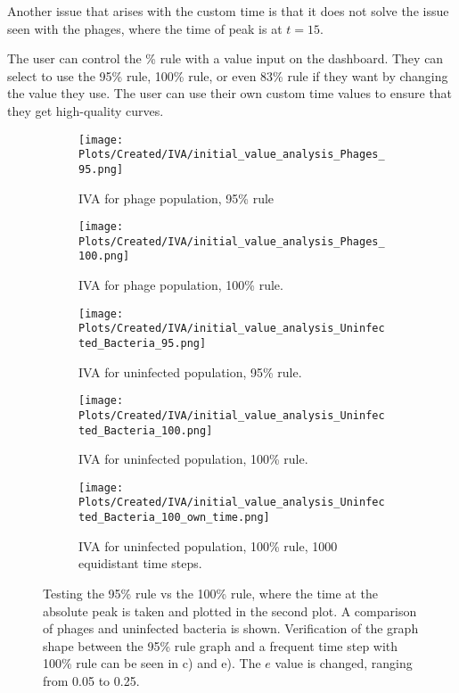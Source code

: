 Another issue that arises with the custom time is that it does not solve the issue seen with the phages, where the time of peak is at $t=15$. 

The user can control the \% rule with a value input on the dashboard. 
They can select to use the 95\% rule, 100\% rule, or even 83\% rule if they want by changing the value they use. 
The user can use their own custom time values to ensure that they get high-quality curves. 

\begin{figure}
    \centering
    \begin{subfigure}{1\linewidth}
        \centering
        \texttt{[image: Plots/Created/IVA/initial\_value\_analysis\_Phages\_95.png]}
        \caption{
            IVA for phage population, 95\% rule
        }
        \label{fig:appendixF:IVA_phage_95}
    \end{subfigure}
    \hfill
    \begin{subfigure}{1\linewidth}
        \centering
        \texttt{[image: Plots/Created/IVA/initial\_value\_analysis\_Phages\_100.png]}
        \caption{
            IVA for phage population, 100\% rule.  
        }
        \label{fig:appendixF:IVA_phages_100}
    \end{subfigure}
    \hfill
    \begin{subfigure}{1\linewidth}
        \centering
        \texttt{[image: Plots/Created/IVA/initial\_value\_analysis\_Uninfected\_Bacteria\_95.png]}
        \caption{
            IVA for uninfected population, 95\% rule. 
        }
        \label{fig:appendixF:IVA_uninfected_bacteria_95}
    \end{subfigure}
    \hfill 
    \begin{subfigure}{1\linewidth}
        \centering
        \texttt{[image: Plots/Created/IVA/initial\_value\_analysis\_Uninfected\_Bacteria\_100.png]}
        \caption{
            IVA for uninfected population, 100\% rule. 
        }
        \label{fig:appendixF:IVA_uninfected_bacteria_100}
    \end{subfigure}
    \begin{subfigure}{1\linewidth}
        \centering
        \texttt{[image: Plots/Created/IVA/initial\_value\_analysis\_Uninfected\_Bacteria\_100\_own\_time.png]}
        \caption{
            IVA for uninfected population, 100\% rule, 1000 equidistant time steps. 
        }
        \label{fig:appendixF:IVA_uninfected_bacteria_100_own_time}
    \end{subfigure}
    \caption{
        Testing the 95\% rule vs the 100\% rule, where the time at the absolute peak is taken and plotted in the second plot. 
        A comparison of phages and uninfected bacteria is shown. 
        Verification of the graph shape between the 95\% rule graph and a frequent time step with 100\% rule can be seen in c) and e). 
        The $e$ value is changed, ranging from 0.05 to 0.25. 
    }
    \label{fig:appendixF:IVA_95_vs_100}
\end{figure}

